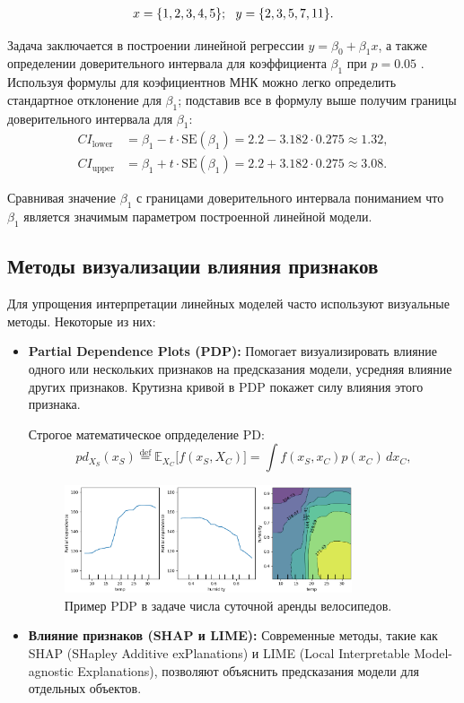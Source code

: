 \begin{align}
x = \{1, 2, 3, 4, 5\}; \text{\space\space} y = \{2, 3, 5, 7, 11\}.
\end{align}

Задача заключается в построении линейной регрессии \(y = \beta_0 + \beta_1 x\), а также определении доверительного интервала для коэффициента \(\beta_1\) при \(p = 0.05\) . Используя формулы для коэфициентнов МНК можно легко определить стандартное отклонение для \(\beta_1\); подставив все в формулу выше получим границы доверительного интервала для \(\beta_1\):
\begin{align*}
CI_{\text{lower}} &= \beta_1 - t \cdot \text{SE}(\beta_1) = 2.2 - 3.182 \cdot 0.275 \approx 1.32, \\
CI_{\text{upper}} &= \beta_1 + t \cdot \text{SE}(\beta_1) = 2.2 + 3.182 \cdot 0.275 \approx 3.08.
\end{align*}

Сравнивая значение \(\beta_1\) с границами доверительного интервала пониманием что \(\beta_1\) является значимым параметром построенной линейной модели.

\subsection*{Методы визуализации влияния признаков}
Для упрощения интерпретации линейных моделей часто используют визуальные методы. Некоторые из них:
\begin{itemize}
    \item \textbf{Partial Dependence Plots (PDP):} Помогает визуализировать влияние одного или нескольких признаков на предсказания модели, усредняя влияние других признаков. Крутизна кривой в PDP покажет силу влияния этого признака.

    Строгое математическое опрдеделение PD:
    \begin{equation}
    pd_{X_S}(x_S) \overset{\text{def}}{=} \mathbb{E}_{X_C} \big[f(x_S, X_C)\big]
    = \int f(x_S, x_C) p(x_C) \, dx_C,
    \end{equation}

    \begin{figure}[h!]
    \centering
    \includegraphics[width=0.8\textwidth]{chapters/linear/pics/partial_dependence.png}
    \caption{Пример PDP в задаче числа суточной аренды велосипедов.}
    \label{fig:pdp}
    \end{figure}

    \item \textbf{Влияние признаков (SHAP и LIME):} Современные методы, такие как SHAP (SHapley Additive exPlanations) и LIME (Local Interpretable Model-agnostic Explanations), позволяют объяснить предсказания модели для отдельных объектов.
\end{itemize}

